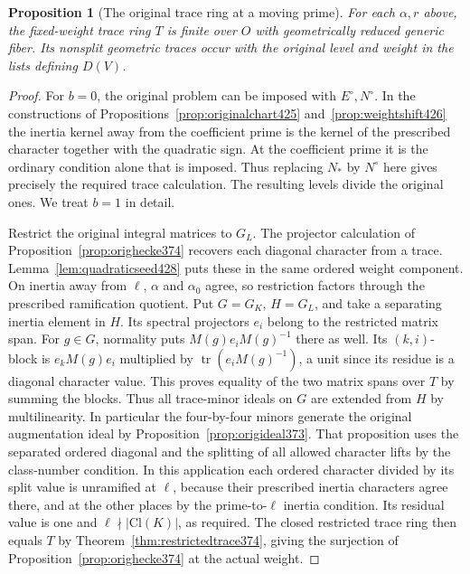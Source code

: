 \documentclass[a4paper,11pt]{article}
\newtheorem{proposition}{Proposition}[section]
\theoremstyle{definition}
\theoremstyle{remark}
\numberwithin{equation}{section}
\begin{document}
\begin{proposition}[The original trace ring at a moving prime]\leavevmode
\label{prop:movinglabels428}
For each \(\alpha,r\) above, the fixed-weight trace ring \(T\)
is finite over \(O\) with geometrically reduced generic fiber.
Its nonsplit geometric traces occur with the original level
and weight in the lists defining \(D(V)\).
\end{proposition}
\begin{proof}
For \(b=0\), the original problem can be imposed with
\(E^\circ,N^\circ\). In the constructions of
Propositions~\ref{prop:originalchart425} and~\ref{prop:weightshift426}
the inertia kernel away from the coefficient prime is the
kernel of the prescribed character together with the quadratic
sign. At the coefficient prime it is the ordinary condition
alone that is imposed. Thus replacing \(N_*\) by \(N^\circ\)
here gives precisely the required trace calculation. The
resulting levels divide the original ones. We treat \(b=1\)
in detail.

Restrict the original integral matrices to \(G_L\). The
projector calculation of Proposition~\ref{prop:orighecke374}
recovers each diagonal character from a trace. Lemma~\ref{lem:quadraticseed428}
puts these in the same ordered weight component. On inertia
away from \(\ell\), \(\alpha\) and \(\alpha_0\) agree, so
restriction factors through the prescribed ramification
quotient. Put \(G=G_K\), \(H=G_L\), and take a separating
inertia element in \(H\). Its spectral projectors \(e_i\)
belong to the restricted matrix span. For \(g\in G\),
normality puts \(M(g)e_iM(g)^{-1}\) there as well. Its
\((k,i)\)-block is \(e_kM(g)e_i\) multiplied by
\(\operatorname{tr}(e_iM(g)^{-1})\), a unit since its
residue is a diagonal character value. This proves equality
of the two matrix spans over \(T\) by summing the blocks.
Thus all trace-minor ideals on \(G\) are extended from \(H\)
by multilinearity. In particular the four-by-four minors
generate the original augmentation ideal by
Proposition~\ref{prop:origideal373}. That proposition uses
the separated ordered diagonal and the splitting of all
allowed character lifts by the class-number condition. In
this application each ordered character divided by its split
value is unramified at \(\ell\), because their prescribed
inertia characters agree there, and at the other places by
the prime-to-\(\ell\) inertia condition. Its residual value
is one and \(\ell\nmid|\mathrm{Cl}(K)|\), as required.
The closed restricted trace ring then equals \(T\) by
Theorem~\ref{thm:restrictedtrace374}, giving the surjection
of Proposition~\ref{prop:orighecke374} at the actual weight.


\end{proof}
\end{document}
